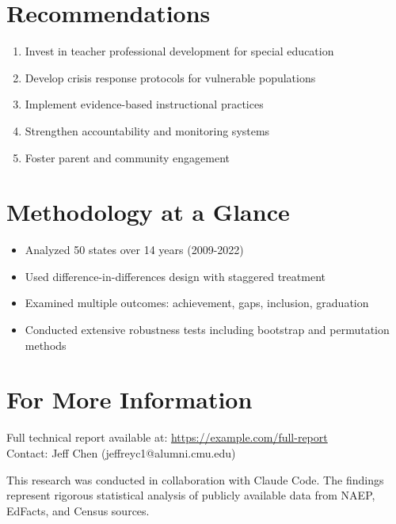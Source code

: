\documentclass[11pt,letterpaper]{article}
\begin{document}
\section*{Recommendations}
\begin{enumerate}[leftmargin=*,itemsep=0.5em]
\item Invest in teacher professional development for special education
\item Develop crisis response protocols for vulnerable populations
\item Implement evidence-based instructional practices
\item Strengthen accountability and monitoring systems
\item Foster parent and community engagement

\end{enumerate}

\section*{Methodology at a Glance}
\begin{itemize}[leftmargin=*,itemsep=0.3em]
\item Analyzed 50 states over 14 years (2009-2022)
\item Used difference-in-differences design with staggered treatment
\item Examined multiple outcomes: achievement, gaps, inclusion, graduation
\item Conducted extensive robustness tests including bootstrap and permutation methods
\end{itemize}

\section*{For More Information}
Full technical report available at: \url{https://example.com/full-report}\\
Contact: Jeff Chen (jeffreyc1@alumni.cmu.edu)

\vfill
\noindent
\small{This research was conducted in collaboration with Claude Code. The findings represent 
rigorous statistical analysis of publicly available data from NAEP, EdFacts, and Census sources.}
\end{document}
